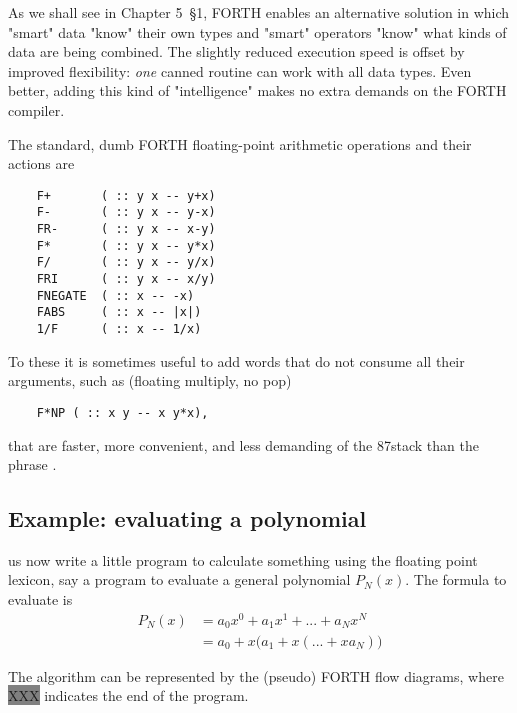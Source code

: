 As we shall see in Chapter 5~\S1, FORTH enables an alternative
solution in which "smart" data "know" their own types and
"smart" operators "know" what kinds of data are being combined.
The slightly reduced execution speed is offset by improved
flexibility: \textit{one} canned routine can work with all data types. Even
better, adding this kind of "intelligence" makes no extra demands
on the FORTH compiler.

The standard, dumb FORTH floating-point arithmetic operations and their actions are

\begin{lstlisting}
    F+       ( :: y x -- y+x)
    F-       ( :: y x -- y-x)
    FR-      ( :: y x -- x-y)
    F*       ( :: y x -- y*x)
    F/       ( :: y x -- y/x)
    FRI      ( :: y x -- x/y)
    FNEGATE  ( :: x -- -x)
    FABS     ( :: x -- |x|)
    1/F      ( :: x -- 1/x)
\end{lstlisting}

To these it is sometimes useful to add words that do not consume all their arguments, such as  (floating multiply, no pop)

\begin{lstlisting}
    F*NP ( :: x y -- x y*x),
\end{lstlisting}

that are faster, more convenient, and less demanding of the 87stack than the phrase .

\subsection{Example: evaluating a polynomial}
 us now write a little program to calculate something using the floating point lexicon, say a program to evaluate a general polynomial $P_N (x)$. The formula to evaluate is
\begin{align}
    P_N(x)&=a_0x^0+a_1x^1+...+a_Nx^N \nonumber \\
    &=a_0+x\big(a_1+x(... +xa_N)\big)\nonumber
\end{align}


The algorithm can be represented by the (pseudo) FORTH flow diagrams, where {\colorbox{gray}{\color{gray}XXX}} indicates the end of the program.

